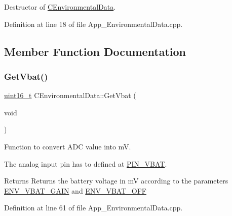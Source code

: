 Destructor of \mbox{\hyperlink{class_c_environmental_data}{C\+Environmental\+Data}}. 



Definition at line 18 of file App\+\_\+\+Environmental\+Data.\+cpp.



\subsection{Member Function Documentation}
\mbox{\label{class_c_environmental_data_a12a6d60a2a0aa406beb82375fa60e875}} 
\subsubsection{\texorpdfstring{Get\+Vbat()}{GetVbat()}}
{\footnotesize\ttfamily \mbox{\hyperlink{_a_d_a_s___types_8h_a1f1825b69244eb3ad2c7165ddc99c956}{uint16\+\_\+t}} C\+Environmental\+Data\+::\+Get\+Vbat (\begin{DoxyParamCaption}\item[{void}]{ }\end{DoxyParamCaption})\hspace{0.3cm}{\ttfamily [virtual]}}



Function to convert A\+DC value into mV. 

The analog input pin has to defined at \mbox{\hyperlink{_a_d_a_s___cfg_8h_ad9c869803f9fc9e3ffc9e962c19f028d}{P\+I\+N\+\_\+\+V\+B\+AT}}. \begin{DoxyReturn}{Returns}
Returns the battery voltage in mV according to the parameters \mbox{\hyperlink{_a_d_a_s___cfg_8h_a9b007d258cc627ea79aa06cef42c0851}{E\+N\+V\+\_\+\+V\+B\+A\+T\+\_\+\+G\+A\+IN}} and \mbox{\hyperlink{_a_d_a_s___cfg_8h_a60f7517e6d36bf5703fc24eacb2f17ed}{E\+N\+V\+\_\+\+V\+B\+A\+T\+\_\+\+O\+FF}} 
\end{DoxyReturn}


Definition at line 61 of file App\+\_\+\+Environmental\+Data.\+cpp.

